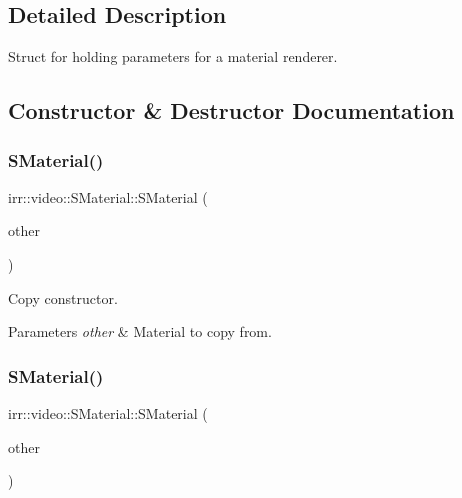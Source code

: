 \subsection{Detailed Description}
Struct for holding parameters for a material renderer. 

\subsection{Constructor \& Destructor Documentation}
\mbox{\label{classirr_1_1video_1_1SMaterial_a66f175294b99e3cc2816e9cc0f372ce3}} 
\subsubsection{\texorpdfstring{S\+Material()}{SMaterial()}\hspace{0.1cm}{\footnotesize\ttfamily [1/2]}}
{\footnotesize\ttfamily irr\+::video\+::\+S\+Material\+::\+S\+Material (\begin{DoxyParamCaption}\item[{const \hyperlink{classirr_1_1video_1_1SMaterial}{S\+Material} \&}]{other }\end{DoxyParamCaption})\hspace{0.3cm}{\ttfamily [inline]}}



Copy constructor. 


\begin{DoxyParams}{Parameters}
{\em other} & Material to copy from. \\
\hline
\end{DoxyParams}
\mbox{\label{classirr_1_1video_1_1SMaterial_a66f175294b99e3cc2816e9cc0f372ce3}} 
\subsubsection{\texorpdfstring{S\+Material()}{SMaterial()}\hspace{0.1cm}{\footnotesize\ttfamily [2/2]}}
{\footnotesize\ttfamily irr\+::video\+::\+S\+Material\+::\+S\+Material (\begin{DoxyParamCaption}\item[{const \hyperlink{classirr_1_1video_1_1SMaterial}{S\+Material} \&}]{other }\end{DoxyParamCaption})\hspace{0.3cm}{\ttfamily [inline]}}



